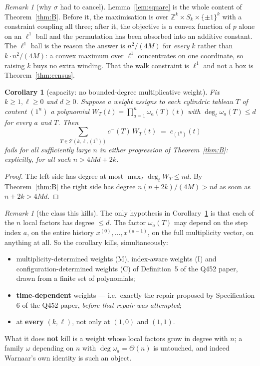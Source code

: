 \documentclass[11pt]{article}
\theoremstyle{plain}
\newtheorem{corollary}[theorem]{Corollary}
\theoremstyle{definition}
\theoremstyle{remark}
\newtheorem{remark}[theorem]{Remark}
\newcommand{\Z}{\mathbb{Z}}
\newcommand{\cm}{c^{-}}
\newcommand{\onen}{(1^{n})}
\begin{document}
\begin{remark}[why $\sigma$ had to cancel]
Lemma~\ref{lem:square} is the whole content of Theorem~\ref{thm:B}. Before it, the
maximisation is over $\Z^k\times S_k\times\{\pm1\}^k$ with a constraint coupling all three;
after it, the objective is a convex function of $p$ alone on an $\ell^1$ ball and the
permutation has been absorbed into an additive constant. The $\ell^1$ ball is the reason
the answer is $n^2/(4M)$ for \emph{every} $k$ rather than $k\cdot n^2/(4M)$: a convex
maximum over $\ell^1$ concentrates on one coordinate, so raising $k$ buys no extra winding.
That the walk constraint is $\ell^1$ and not a box is Theorem~\ref{thm:census}.
\end{remark}

\begin{corollary}[capacity: no bounded-degree multiplicative weight]\label{cor:cap}
Fix $k\ge1,\ell\ge0$ and $d\ge0$. Suppose a weight assigns to each cylindric tableau $T$ of
content $\onen$ a polynomial $W_T(t)=\prod_{a=1}^{n}\omega_a(T)(t)$ with
$\deg_t\omega_a(T)\le d$ for every $a$ and $T$. Then
\[
  \sum_{T\in\mathcal T(k,\ell,\onen)}\cm(T)\,W_T(t)\;=\;c_\onen(t)
\]
fails for all sufficiently large $n$ in either progression of Theorem~\ref{thm:B}:
explicitly, for all such $n>4Md+2k$.
\end{corollary}

\begin{proof}
The left side has degree at most $\max_T\deg_t W_T\le nd$. By Theorem~\ref{thm:B} the right
side has degree $n(n+2k)/(4M)>nd$ as soon as $n+2k>4Md$.
\end{proof}

\begin{remark}[the class this kills]
The only hypothesis in Corollary~\ref{cor:cap} is that each of the $n$ local factors has
degree $\le d$. The factor $\omega_a(T)$ may depend on the step index $a$, on the entire
history $x^{(0)},\dots,x^{(a-1)}$, on the full multiplicity vector, on anything at all.
So the corollary kills, simultaneously:
\begin{itemize}
\item multiplicity-determined weights (M), index-aware weights (I) and
  configuration-determined weights (C) of Definition~5 of the Q452 paper, drawn from a
  finite set of polynomials;
\item \textbf{time-dependent} weights --- i.e.\ exactly the repair proposed by
  Specification 6 of the Q452 paper, \emph{before that repair was attempted};
\item at \textbf{every} $(k,\ell)$, not only at $(1,0)$ and $(1,1)$.
\end{itemize}
What it does \textbf{not} kill is a weight whose local factors grow in degree with $n$;
a family $\omega$ depending on $n$ with $\deg\omega_a=\Theta(n)$ is untouched, and indeed
Warnaar's own identity is such an object.
\end{remark}
\end{document}
